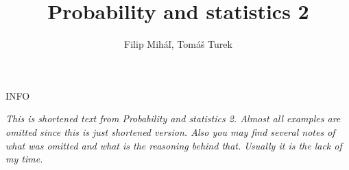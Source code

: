 \documentclass[12pt,a4paper]{report}
\title{Probability and statistics 2}
\author{Filip Miháľ, Tomáš Turek}
\begin{document}
	\maketitle
	
	\begin{center}
		INFO
	\end{center}
	
	\textit{This is shortened text from Probability and statistics 2. Almost all examples are omitted since this is just shortened version. Also you may find several notes of what was omitted and what is the reasoning behind that. Usually it is the lack of my time.}
	
	\tableofcontents
	
	
	
	
	
	
\end{document}
